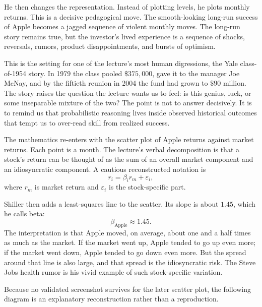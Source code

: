 He then changes the representation. Instead of plotting levels, he plots monthly returns. This is a decisive pedagogical move. The smooth-looking long-run success of Apple becomes a jagged sequence of violent monthly moves. The long-run story remains true, but the investor's lived experience is a sequence of shocks, reversals, rumors, product disappointments, and bursts of optimism.

This is the setting for one of the lecture's most human digressions, the Yale class-of-1954 story. In 1979 the class pooled \(\$375{,}000\), gave it to the manager Joe McNay, and by the fiftieth reunion in 2004 the fund had grown to \(\$90\) million. The story raises the question the lecture wants us to feel: is this genius, luck, or some inseparable mixture of the two? The point is not to answer decisively. It is to remind us that probabilistic reasoning lives inside observed historical outcomes that tempt us to over-read skill from realized success.

The mathematics re-enters with the scatter plot of Apple returns against market returns. Each point is a month. The lecture's verbal decomposition is that a stock's return can be thought of as the sum of an overall market component and an idiosyncratic component. A cautious reconstructed notation is
\begin{equation}
r_i=\beta_i r_m+\varepsilon_i,
\end{equation}
where \(r_m\) is market return and \(\varepsilon_i\) is the stock-specific part.

Shiller then adds a least-squares line to the scatter. Its slope is about \(1.45\), which he calls beta:
\begin{equation}
\beta_{\mathrm{Apple}}\approx 1.45.
\end{equation}
The interpretation is that Apple moved, on average, about one and a half times as much as the market. If the market went up, Apple tended to go up even more; if the market went down, Apple tended to go down even more. But the spread around that line is also large, and that spread is the idiosyncratic risk. The Steve Jobs health rumor is his vivid example of such stock-specific variation.

Because no validated screenshot survives for the later scatter plot, the following diagram is an explanatory reconstruction rather than a reproduction.

